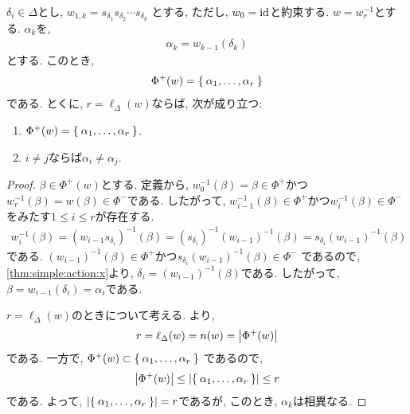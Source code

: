 \begin{prop}
  $\delta_i\in\Delta$とし,
  $w_{1,k}=s_{\delta_1}s_{\delta_{2}}\cdots s_{\delta_k}$
  とする, ただし, $w_{0}=\operatorname{id}$と約束する.
  $w=w_{r}^{-1}$とする.
  $\alpha_k$を,
  \begin{align*}
    \alpha_k=w_{k-1}(\delta_{k})
  \end{align*}
  とする.
  このとき,
  \begin{align*}
    \Phi^+(w)=\Set{\alpha_1,\ldots,\alpha_r}
  \end{align*}
  である.
  とくに,
  $r=\ell_\Delta(w)$ならば, 次が成り立つ:
  \begin{enumerate}
  \item
    $\Phi^+(w)=\Set{\alpha_1,\ldots,\alpha_r}$.
  \item
    $i\neq j$ならば$\alpha_i\neq \alpha_j$.
  \end{enumerate}
\end{prop}

\begin{proof}
  $\beta\in\Phi^+(w)$とする.
  定義から,
  $w_{0}^{-1}(\beta)=\beta\in\Phi^+$かつ$w_r^{-1}(\beta)=w(\beta)\in\Phi^-$である.
  したがって, $w_{i-1}^{-1}(\beta)\in \Phi^+$かつ$w_{i}^{-1}(\beta)\in \Phi^-$
  をみたす$1\leq i\leq r$が存在する.
  \begin{align*}
    w_{i}^{-1}(\beta)=(w_{i-1}s_{\delta_i})^{-1}(\beta)
    =(s_{\delta_i})^{-1}(w_{i-1})^{-1}(\beta)
    =s_{\delta_i}(w_{i-1})^{-1}(\beta)
  \end{align*}
  である.
  $(w_{i-1})^{-1}(\beta)\in \Phi^+$かつ$s_{\delta_i}(w_{i-1})^{-1}(\beta)\in\Phi^-$
  であるので,
  \cref{thm:simple:action:x}より,
  $\delta_i=(w_{i-1})^{-1}(\beta)$である.
  したがって,
  $\beta=w_{i-1}(\delta_i)=\alpha_i$である.

  
  $r=\ell_\Delta(w)$のときについて考える.
  より,
  \begin{align*}
    r=\ell_\Delta(w)=n(w)=\left|\Phi^+(w)\right|
  \end{align*}
  である.
  一方で, $\Phi^+(w)\subset \Set{\alpha_1,\ldots,\alpha_r}$
  であるので,
  \begin{align*}
    \left|\Phi^+(w)\right|\leq \left|\Set{\alpha_1,\ldots,\alpha_r}\right|\leq r
  \end{align*}
  である.
  よって,
  $\left|\Set{\alpha_1,\ldots,\alpha_r}\right|=r$であるが,
  このとき, $\alpha_k$は相異なる.

\end{proof}


